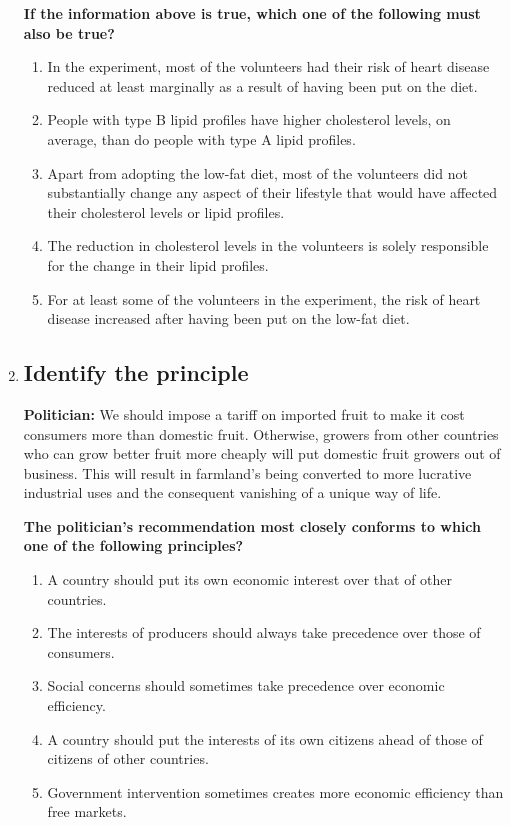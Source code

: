 \documentclass[9pt]{article}
\begin{document}
\begin{multicols}{2}
\begin{enumerate}
\noindent
\textbf{If the information above is true, which one of the following must also be true?}

\begin{enumerate}[label=(\alph*)]
    \item In the experiment, most of the volunteers had their risk of heart disease reduced at least marginally as a result of having been put on the diet.
    \item People with type B lipid profiles have higher cholesterol levels, on average, than do people with type A lipid profiles.
    \item Apart from adopting the low-fat diet, most of the volunteers did not substantially change any aspect of their lifestyle that would have affected their cholesterol levels or lipid profiles.
    \item The reduction in cholesterol levels in the volunteers is solely responsible for the change in their lipid profiles.
    \item For at least some of the volunteers in the experiment, the risk of heart disease increased after having been put on the low-fat diet.
\end{enumerate}

\item
\subsection*{Identify the principle}
\noindent
\textbf{Politician:} We should impose a tariff on imported fruit to make it cost consumers more than domestic fruit. Otherwise, growers from other countries who can grow better fruit more cheaply will put domestic fruit growers out of business. This will result in farmland's being converted to more lucrative industrial uses and the consequent vanishing of a unique way of life.

 

\noindent
\textbf{The politician's recommendation most closely conforms to which one of the following principles?}

\begin{enumerate}[label=(\alph*)]
    \item A country should put its own economic interest over that of other countries.
    \item The interests of producers should always take precedence over those of consumers.
    \item Social concerns should sometimes take precedence over economic efficiency.
    \item A country should put the interests of its own citizens ahead of those of citizens of other countries.
    \item Government intervention sometimes creates more economic efficiency than free markets.
\end{enumerate}


\end{enumerate}
\end{multicols}
\end{document}
